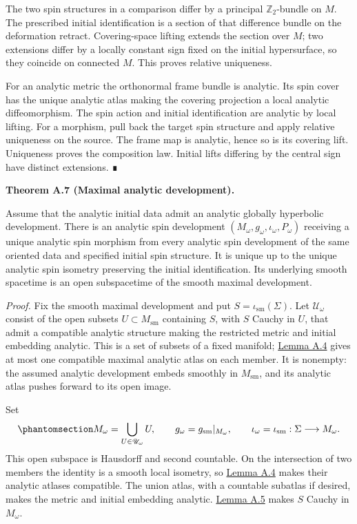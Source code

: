 \documentclass[
  english,
  11pt,
  reqno]{amsart}
\makeatletter
\newcounter{none} %
\newcommand{\pandocstatementheading}[1]{%
  \par\addpenalty{\@beginparpenalty}%
  \addvspace{.5\baselineskip plus .2\baselineskip minus .2\baselineskip}%
  {\normalfont\bfseries #1\par}%
  \nobreak\@afterindenttrue\@afterheading
}
\makeatother
\begin{document}
The two spin structures in a comparison differ by a principal
\(\mathbb Z_2\)-bundle on \(M\). The prescribed initial identification
is a section of that difference bundle on the deformation retract.
Covering-space lifting extends the section over \(M\); two extensions
differ by a locally constant sign fixed on the initial hypersurface, so
they coincide on connected \(M\). This proves relative uniqueness.

For an analytic metric the orthonormal frame bundle is analytic. Its
spin cover has the unique analytic atlas making the covering projection
a local analytic diffeomorphism. The spin action and initial
identification are analytic by local lifting. For a morphism, pull back
the target spin structure and apply relative uniqueness on the source.
The frame map is analytic, hence so is its covering lift. Uniqueness
proves the composition law. Initial lifts differing by the central sign
have distinct extensions. ∎

\pandocstatementheading{\protect{}\label{thm:maximal-analytic-development-v2}Theorem A.7 (Maximal analytic development).}

Assume that the analytic initial data admit an analytic globally
hyperbolic development. There is an analytic spin development
\((M_\omega,g_\omega,\iota_\omega,P_\omega)\) receiving a unique
analytic spin morphism from every analytic spin development of the same
oriented data and specified initial spin structure. It is unique up to
the unique analytic spin isometry preserving the initial identification.
Its underlying smooth spacetime is an open subspacetime of the smooth
maximal development.

\emph{Proof.} Fix the smooth maximal development and put
\(S=\iota_{\mathrm{sm}}(\Sigma)\). Let \(\mathscr U_\omega\) consist of
the open subsets \(U\subset M_{\mathrm{sm}}\) containing \(S\), with
\(S\) Cauchy in \(U\), that admit a compatible analytic structure making
the restricted metric and initial embedding analytic. This is a set of
subsets of a fixed manifold; \hyperref[lem:analytic-isometries]{Lemma
A.4} gives at most one compatible maximal analytic atlas on each member.
It is nonempty: the assumed analytic development embeds smoothly in
\(M_{\mathrm{sm}}\), and its analytic atlas pushes forward to its open
image.

Set
\begin{equation}\protect\phantomsection\label{eq:maximal-analytic-union}{
M_\omega=\bigcup_{U\in\mathscr U_\omega}U,
\qquad g_\omega=g_{\mathrm{sm}}|_{M_\omega},
\qquad \iota_\omega=\iota_{\mathrm{sm}}:\Sigma\longrightarrow M_\omega.
}\end{equation} This open subspace is Hausdorff and second countable. On
the intersection of two members the identity is a smooth local isometry,
so \hyperref[lem:analytic-isometries]{Lemma A.4} makes their analytic
atlases compatible. The union atlas, with a countable subatlas if
desired, makes the metric and initial embedding analytic.
\hyperref[lem:cauchy-union]{Lemma A.5} makes \(S\) Cauchy in
\(M_\omega\).
\end{document}
